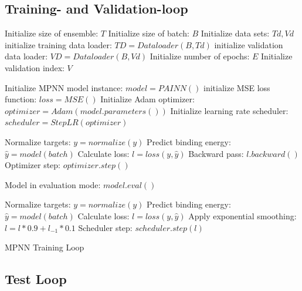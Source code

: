 \subsection{Training- and Validation-loop}\label{subsec:training}

\begin{algorithm}[H]
    \begin{algorithmic}[1]
        \State Initialize size of ensemble: $T$
        \State Initialize size of batch: $B$
        \State Initialize data sets: $Td, Vd$
        \State initialize training data loader: $TD = Dataloader(B,Td)$
        \State initialize validation data loader: $VD = Dataloader(B,Vd)$
        \State Initialize number of epochs: $E$
        \State Initialize validation index: $V$


        \State Initialize MPNN model instance: $model = PAINN()$
        \State initialize MSE loss function: $loss = MSE()$
        \State Initialize Adam optimizer: $optimizer = Adam(model.parameters())$
        \State Initialize learning rate scheduler: $scheduler = StepLR(optimizer)$



        \State Normalize targets: $y = normalize(y)$
        \State Predict binding energy: $\hat{y} = model(batch)$
        \State Calculate loss: $l = loss(y,\hat{y})$
        \State Backward pass: $l.backward()$
        \State Optimizer step: $optimizer.step()$

        \State Model in evaluation mode: $model.eval()$


        \State Normalize targets: $y = normalize(y)$
        \State Predict binding energy: $\hat{y} = model(batch)$
        \State Calculate loss: $l = loss(y,\hat{y})$
        \State Apply exponential smoothing: $l = l * 0.9 + l_{-1} * 0.1$
        \State Scheduler step: $scheduler.step(l)$
        \EndFor

        \EndIf
        \EndFor
        \EndFor
        \EndFor
    \end{algorithmic}
    \caption{MPNN Training Loop}
    \label{algo:MPNN_training}
\end{algorithm}

\subsection{Test Loop}\label{subsec:test}

